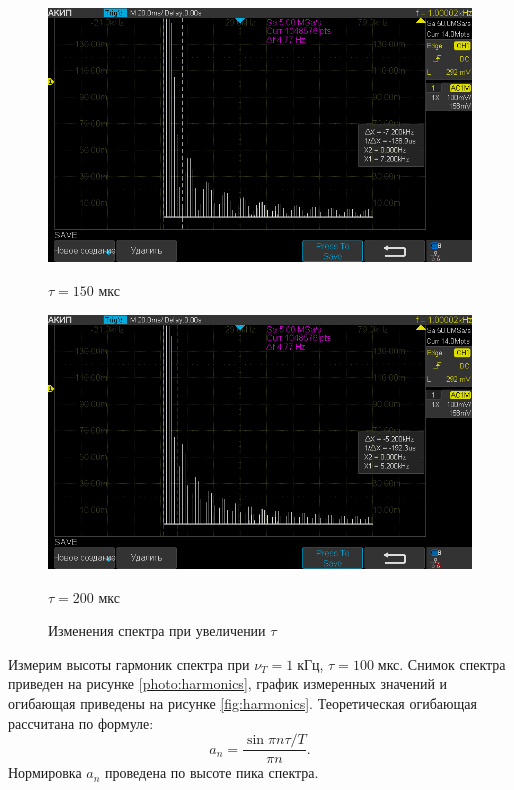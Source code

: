 \begin{figure}[H]
	\centering
	\begin{minipage}[b]{.5\textwidth}
		\centering
		\includegraphics[width=0.9\linewidth]{"../photos/impulse6.png"}
		\caption*{$\tau = 150$ мкс}
	\end{minipage}%
	\begin{minipage}[b]{.5\textwidth}
		\centering
		\includegraphics[width=0.9\linewidth]{"../photos/impulse7.png"}
		\caption*{$\tau = 200$ мкс}
	\end{minipage}
	\caption{Изменения спектра при увеличении $\tau$}
	\label{photo:impulse_tau}
\end{figure}

Измерим высоты гармоник спектра при $\nu_T = 1 \; \text{кГц}$, $\tau = 100 \; \text{мкс}$. Снимок спектра приведен на рисунке \ref{photo:harmonics}, график измеренных значений и огибающая приведены на рисунке \ref{fig:harmonics}. Теоретическая огибающая рассчитана по формуле:
$$ a_n = \frac{\sin{\pi n \tau / T}}{\pi n}. $$
 Нормировка $a_n$ проведена по высоте пика спектра.


